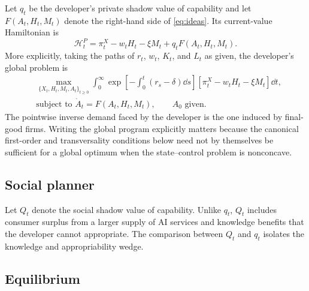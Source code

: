 Let $q_t$ be the developer's private shadow value of capability and let
$F(A_t,H_t,M_t)$ denote the right-hand side of \eqref{eq:ideas}. Its current-value
Hamiltonian is
\begin{equation}
    \mathcal H^P_t
    =
    \pi^X_t-w_tH_t-\xi M_t
    +q_tF(A_t,H_t,M_t).
    \label{eq:private-hamiltonian}
\end{equation}
More explicitly, taking the paths of $r_t$, $w_t$, $K_t$, and $L_t$ as given, the
developer's global problem is
\begin{equation}
\begin{aligned}
    &\max_{\{X_t,H_t,M_t,A_t\}_{t\geq0}}
    \int_0^\infty
    \exp\!\left[-\int_0^t(r_s-\delta)\dd s\right]
    \left[\pi^X_t-w_tH_t-\xi M_t\right]\dd t,\\
    &\text{subject to }\dot A_t=F(A_t,H_t,M_t),
    \qquad A_0\text{ given}.
\end{aligned}
    \label{eq:developer-market-value-program}
\end{equation}
The pointwise inverse demand faced by the developer is the one induced by final-good
firms. Writing the global program explicitly matters because the canonical first-order
and transversality conditions below need not by themselves be sufficient for a global
optimum when the state--control problem is nonconcave.

\subsection{Social planner}

Let $Q_t$ denote the social shadow value of capability. Unlike $q_t$, $Q_t$ includes
consumer surplus from a larger supply of AI services and knowledge benefits that the
developer cannot appropriate. The comparison between $Q_t$ and $q_t$ isolates the
knowledge and appropriability wedge.

\subsection{Equilibrium}

